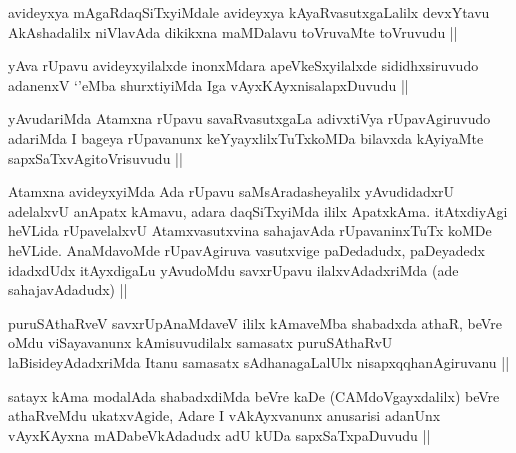 \begin{artha}
avideyxya mAgaRdaqSiTxyiMdale avideyxya kAyaRvasutxgaLalilx devxYtavu AkAshadalilx niVlavAda dikikxna maMDalavu toVruvaMte toVruvudu ||
\end{artha}


\begin{artha}
yAva rUpavu avideyxyilalxde inonxMdara apeVkeSxyilalxde sididhxsiruvudo adanenxV `\stext'eMba shurxtiyiMda Iga vAyxKAyxnisalapxDuvudu ||
\end{artha}

\begin{artha}
yAvudariMda Atamxna rUpavu savaRvasutxgaLa adivxtiVya rUpavAgiruvudo adariMda I bageya rUpavanunx keYyayxlilxTuTxkoMDa bilavxda kAyiyaMte sapxSaTxvAgitoVrisuvudu ||
\end{artha}


\begin{artha}
Atamxna avideyxyiMda Ada rUpavu saMsAradasheyalilx yAvudidadxrU adelalxvU anApatx kAmavu, adara daqSiTxyiMda ililx ApatxkAma. itAtxdiyAgi heVLida rUpavelalxvU Atamxvasutxvina sahajavAda rUpavaninxTuTx koMDe heVLide. AnaMdavoMde rUpavAgiruva vasutxvige paDedadudx, paDeyadedx idadxdUdx itAyxdigaLu yAvudoMdu savxrUpavu ilalxvAdadxriMda (ade sahajavAdadudx) ||
\end{artha}


\begin{artha}
puruSAthaRveV savxrUpAnaMdaveV ililx kAmaveMba shabadxda athaR, beVre oMdu viSayavanunx kAmisuvudilalx samasatx puruSAthaRvU laBisideyAdadxriMda Itanu samasatx sAdhanagaLalUlx nisapxqqhanAgiruvanu ||
\end{artha}


\begin{artha}
satayx kAma modalAda shabadxdiMda beVre kaDe (CAMdoVgayxdalilx) beVre athaRveMdu ukatxvAgide, Adare I vAkAyxvanunx anusarisi adanUnx vAyxKAyxna mADabeVkAdadudx adU kUDa sapxSaTxpaDuvudu ||
\end{artha}


